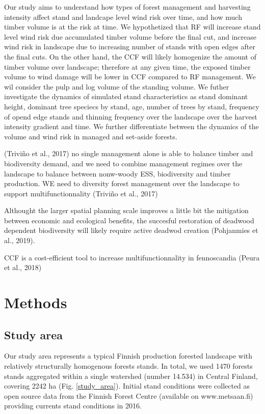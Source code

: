 \documentclass[]{elsarticle} %
\begin{document}
Our study aims to understand how types of forest management and harvesting intensity affect stand and landcape level wind risk over time, and how much timber volume is at the risk at time. We hypothetized that RF will increase stand level wind risk due accumulated timber volume before the final cut, and increase wind risk in landscape due to increasing number of stands with open edges after the final cuts. On the other hand, the CCF will likely homogenize the amount of timber volume over landscape; therefore at any given time, the exposed timber volume to wind damage will be lower in CCF compared to RF management. We wil consider the pulp and log volume of the standing volume. We futher investigate the dynamics of simulated stand characteristics as stand dominant height, dominant tree speciecs by stand, age, number of trees by stand, frequency of opend edge stands and thinning frequency over the landscape over the harvest intensity gradient and time. We further differentiate between the dynamics of the volume and wind risk in managed and set-aside forests.

(Triviño et al., 2017) no single management alone is able to balance timber and biodiversity demand, and we need to combine management regimes over the landscape to balance between nonw-woody ESS, biodiversity and timber production. WE need to diversity forest management over the landscape to support multifunctionnality (Triviño et al., 2017)

Althought the larger spatial planning scale improves a little bit the mitigation between economic and ecological benefits, the succesful restoration of deadwood dependent biodiversity will likely require active deadwod creation (Pohjanmies et al., 2019).

CCF is a cost-efficient tool to increase multifunctionnality in fennoscandia (Peura et al., 2018)

\hypertarget{methods}{%
\section{Methods}\label{methods}}

\hypertarget{study-area}{%
\subsection{Study area}\label{study-area}}

Our study area represents a typical Finnish production forested landscape with relatively structurally homogenous forests stands. In total, we used 1470 forests stands aggregated within a single watershed (number 14.534) in Central Finland, covering 2242 ha (Fig. \ref{study_area}). Initial stand conditions were collected as open source data from the Finnish Forest Centre (available on www.metsaan.fi) providing currents stand conditions in 2016.
\end{document}
